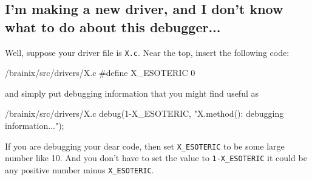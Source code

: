 \subsection{I'm making a new driver, and I don't know what to do about this debugger...}
Well, suppose your driver file is \verb|X.c|. Near the top, insert the following code:
\begin{code}{/brainix/src/drivers/X.c}
 #define X_ESOTERIC     0
\end{code}
and simply put debugging information that you might find useful as
\begin{code}{/brainix/src/drivers/X.c}
     debug(1-X_ESOTERIC, "X.method(): debugging information...");
\end{code}
If you are debugging your dear code, then set \verb|X_ESOTERIC| to be some large number like 10. And you don't have to set the value to \verb|1-X_ESOTERIC| it could be any positive number minus \verb|X_ESOTERIC|.
%

